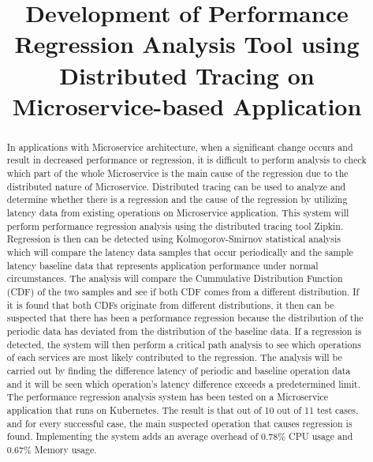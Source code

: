 \documentclass[conference]{configs/IEEEtran}
\begin{document}
\title{Development of Performance Regression Analysis Tool using Distributed Tracing on Microservice-based Application\\
}

\author{
}

\maketitle

\begin{abstract}
In applications with Microservice architecture, when a significant change occurs and result in decreased performance or regression, it is difficult to perform analysis to check which part of the whole Microservice is the main cause of the regression due to the distributed nature of Microservice. Distributed tracing can be used to analyze and determine whether there is a regression and the cause of the regression by utilizing latency data from existing operations on Microservice application.
This system will perform performance regression analysis using the distributed tracing tool Zipkin. Regression is then can be detected using Kolmogorov-Smirnov statistical analysis which will compare the latency data samples that occur
periodically and the sample latency baseline data that represents application performance  under normal circumstances. The analysis will compare the Cummulative
Distribution Function (CDF) of the two samples and see if both
CDF comes from a different distribution. If it is found that both CDFs originate from different distributions, it then can be suspected that there has been a performance regression because the distribution of the periodic data has deviated from the distribution of the baseline data.
If a regression is detected, the system will then perform a critical path analysis to see which operations of each services are most likely contributed to the regression. The analysis will be carried out by finding the difference
latency of periodic and baseline operation data and it will be seen which operation's latency difference exceeds a predetermined limit.
The performance regression analysis system has been tested on a Microservice application that runs on Kubernetes. The result is that out of 10 out of 11 test cases, and for every successful case, the main suspected operation that causes regression is found. Implementing the system adds an average overhead of 0.78\% CPU usage and 0.67\% Memory usage.
\end{abstract}
\end{document}

